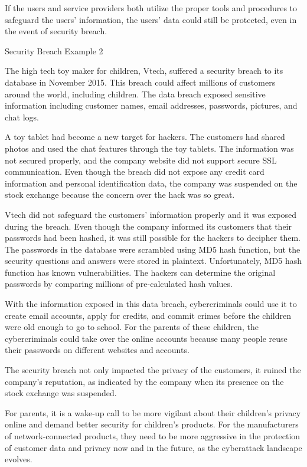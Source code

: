 \documentclass{article}
\begin{document}
If the users and service providers both utilize the proper tools and procedures to safeguard the users’ information, the users’ data could still be protected, even in the event of security breach.


Security Breach Example 2

The high tech toy maker for children, Vtech, suffered a security breach to its database in November 2015. This breach could affect millions of customers around the world, including children. The data breach exposed sensitive information including customer names, email addresses, passwords, pictures, and chat logs.

A toy tablet had become a new target for hackers. The customers had shared photos and used the chat features through the toy tablets. The information was not secured properly, and the company website did not support secure SSL communication. Even though the breach did not expose any credit card information and personal identification data, the company was suspended on the stock exchange because the concern over the hack was so great.

Vtech did not safeguard the customers’ information properly and it was exposed during the breach. Even though the company informed its customers that their passwords had been hashed, it was still possible for the hackers to decipher them. The passwords in the database were scrambled using MD5 hash function, but the security questions and answers were stored in plaintext. Unfortunately, MD5 hash function has known vulnerabilities. The hackers can determine the original passwords by comparing millions of pre-calculated hash values.

With the information exposed in this data breach, cybercriminals could use it to create email accounts, apply for credits, and commit crimes before the children were old enough to go to school. For the parents of these children, the cybercriminals could take over the online accounts because many people reuse their passwords on different websites and accounts.

The security breach not only impacted the privacy of the customers, it ruined the company’s reputation, as indicated by the company when its presence on the stock exchange was suspended.

For parents, it is a wake-up call to be more vigilant about their children’s privacy online and demand better security for children’s products. For the manufacturers of network-connected products, they need to be more aggressive in the protection of customer data and privacy now and in the future, as the cyberattack landscape evolves.
\end{document}
